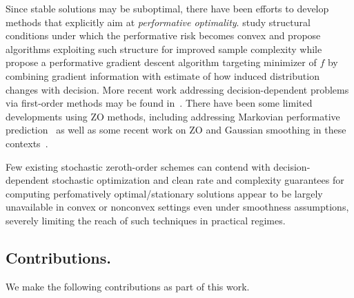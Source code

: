 \documentclass[11pt,reqno]{amsart}
\newcommand{\1}{{\bf 1}}
\newcommand{\2}{{\bf 2}}
\newcommand{\us}[1]{\textcolor{red}{#1}}
\numberwithin{equation}{section}
\theoremstyle{remark}
\begin{document}
		Since stable solutions may be suboptimal, there have been efforts to develop methods that explicitly aim at \emph{performative optimality}. \cite{miller2021echo} study structural conditions under which the performative risk becomes convex and propose algorithms exploiting such structure for improved sample complexity while \cite{izzo2021perfgd} propose a performative gradient descent algorithm targeting minimizer of $f$ by combining gradient information with estimate of how induced distribution changes with decision. {More recent work addressing decision-dependent problems via first-order methods may be found in~\cite{he2025decision,hikima2025stochastic}.} {There have been some limited developments using ZO methods, including addressing Markovian performative prediction~\cite{liutwo} as well as some recent work on ZO and Gaussian smoothing in {these} contexts~\cite{ray2022decision,chen2023performative,hikima2025zero}.}
		
		
		\begin{tcolorbox}  Few existing stochastic zeroth-order schemes can contend with  decision-dependent stochastic optimization and clean rate and complexity guarantees {for computing perfomatively optimal/stationary solutions} appear to be largely unavailable in convex or nonconvex settings even under smoothness assumptions, severely limiting the reach of such techniques in practical regimes.  
		\end{tcolorbox}
		
		
		\subsection{Contributions.} We make the following contributions as part of this work.
		
\end{document}
